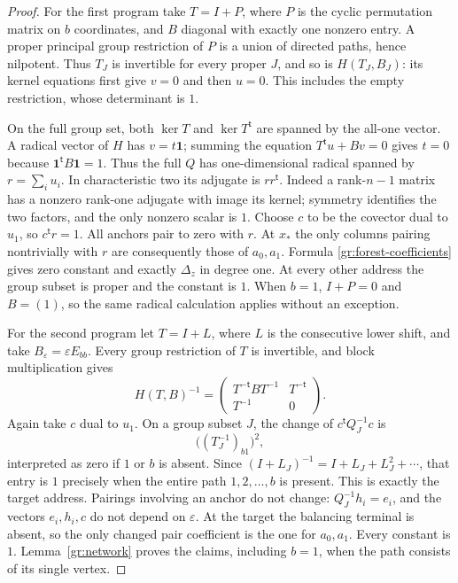 \begin{proof}
For the first program take $T=I+P$, where $P$ is the cyclic permutation
matrix on $b$ coordinates, and $B$ diagonal with exactly one nonzero
entry.  A proper principal group restriction of $P$ is a union of
directed paths, hence nilpotent.  Thus $T_J$ is invertible for every
proper $J$, and so is $H(T_J,B_J)$: its kernel equations first give
$v=0$ and then $u=0$.  This includes the empty restriction, whose
determinant is $1$.

On the full group set, both $\ker T$ and $\ker T^{\mathsf t}$ are
spanned by the all-one vector.  A radical vector of $H$ has
$v=t\mathbf1$; summing the equation $T^{\mathsf t}u+Bv=0$ gives $t=0$
because $\mathbf1^{\mathsf t}B\mathbf1=1$.  Thus the full $Q$ has
one-dimensional radical spanned by $r=\sum_i u_i$.  In characteristic
two its adjugate is $rr^{\mathsf t}$.  Indeed a rank-$n-1$ matrix has a
nonzero rank-one adjugate with image its kernel; symmetry identifies
the two factors, and the only nonzero scalar is $1$.
Choose $c$ to be the covector dual to $u_1$, so $c^{\mathsf t}r=1$.
All anchors pair to zero with $r$.  At $x_*$ the only columns pairing
nontrivially with $r$ are consequently those of $a_0,a_1$.  Formula
\eqref{gr:forest-coefficients} gives zero constant and exactly
$\Delta_z$ in degree one.  At every other address the group subset is
proper and the constant is $1$.  When $b=1$, $I+P=0$ and $B=(1)$,
so the same radical calculation applies without an exception.

For the second program let $T=I+L$, where $L$ is the consecutive lower
shift, and take $B_\varepsilon=\varepsilon E_{bb}$.  Every group
restriction of $T$ is invertible, and block multiplication gives
\begin{equation}\label{gr:inverse}
 H(T,B)^{-1}=
 \begin{pmatrix}T^{-\mathsf t}BT^{-1}&T^{-\mathsf t}\\
 T^{-1}&0\end{pmatrix}.
\end{equation}
Again take $c$ dual to $u_1$.  On a group subset $J$, the change of
$c^{\mathsf t}Q_J^{-1}c$ is
\[
 \bigl((T_J^{-1})_{b1}\bigr)^2,
\]
interpreted as zero if $1$ or $b$ is absent.  Since
$(I+L_J)^{-1}=I+L_J+L_J^2+\cdots$, that entry is $1$ precisely when
the entire path $1,2,\ldots,b$ is present.  This is exactly the target
address.  Pairings involving an anchor do not change:
$Q_J^{-1}h_i=e_i$, and the vectors $e_i,h_i,c$ do not depend on
$\varepsilon$.  At the target the balancing terminal is absent, so
the only changed pair coefficient is the one for $a_0,a_1$.
Every constant is $1$.  Lemma~\ref{gr:network} proves the claims,
including $b=1$, when the path consists of its single vertex.
\end{proof}

